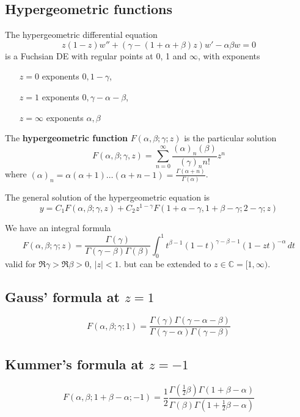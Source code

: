 \documentclass[10pt, oneside, reqno]{amsart}
\theoremstyle{plain}%
\theoremstyle{definition}
\theoremstyle{remark}
\newcommand{\Com}{\mathbb{C}}
\begin{document}


\subsection{Hypergeometric functions} %
\label{sec:hypergeometric_functions}
The hypergeometric differential equation \[
    z(1-z) w'' + (\gamma - (1 + \alpha + \beta)z)w' - \alpha \beta w = 0
\] is a Fuchsian DE with regular points at 0, 1 and $\infty$, with exponents
\begin{itemize}
    \item[$z = 0$] exponents $0, 1 - \gamma$,
    \item[$z = 1$] exponents $0, \gamma - \alpha - \beta$,
    \item[$z = \infty$] exponents $\alpha, \beta$
\end{itemize}

The \textbf{hypergeometric function} $F(\alpha, \beta; \gamma; z)$ is the particular solution \[
    F(\alpha, \beta; \gamma, z) = \sum_{n = 0}^\infty \frac{(\alpha)_n (\beta)}{(\gamma)_n n!} z^n 
\] where $(\alpha)_n = \alpha (\alpha + 1)\dots(\alpha + n - 1) = \frac{\Gamma(\alpha + n)}{\Gamma(\alpha)}$.  

The general solution of the hypergeometric equation is \[
    y  = C_1 F(\alpha, \beta; \gamma, z) + C_2 z^{1 - \gamma} F(1 + \alpha - \gamma, 1 + \beta - \gamma; 2 -\gamma; z)
\]

We have an integral formula \[
    F(\alpha, \beta; \gamma; z) = \frac{\Gamma(\gamma)}{\Gamma(\gamma - \beta)\Gamma(\beta)} \int_0^1 t^{\beta - 1} (1-t)^{\gamma - \beta - 1} (1- zt)^{- \alpha} \,dt
\] valid for $\Re \gamma > \Re \beta > 0$, $|z| < 1$. but can be extended to $z \in \Com = [1,\infty)$.

\subsection{Gauss' formula at $z = 1$} %
\label{sub:gauss_formula_at_z_1_}
    \[
        F(\alpha, \beta; \gamma; 1) = \frac{\Gamma(\gamma)\Gamma(\gamma - \alpha - \beta)}{\Gamma(\gamma - \alpha)\Gamma(\gamma - \beta)}
    \] 
\subsection{Kummer's formula at $z = -1$} %
\label{sub:kummer_s_formula_at_z_1_}
\[
    F(\alpha, \beta; 1 + \beta - \alpha; -1) = \frac{1}{2} \frac{\Gamma(\frac{1}{2}\beta)\Gamma(1 + \beta - \alpha)}{\Gamma(\beta) \Gamma(1 + \frac{1}{2}\beta - \alpha)}
\]
\end{document}
